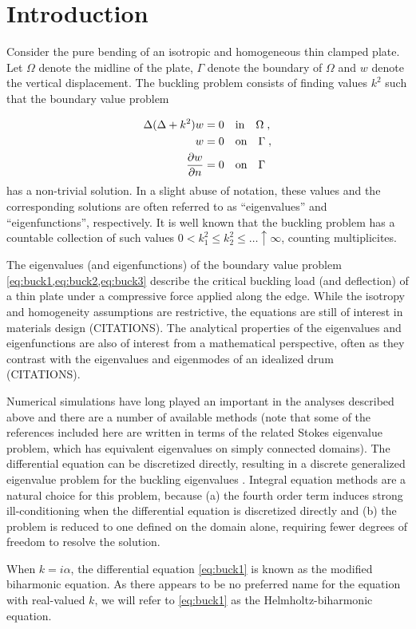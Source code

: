 \section{Introduction}


Consider the pure bending of an isotropic and homogeneous thin clamped
plate. 
Let $\Omega$ denote the midline of the plate, $\Gamma$ denote the 
boundary of $\Omega$ and $w$ denote the vertical displacement.
The buckling problem consists of finding 
values $k^{2}$ such that the boundary value problem

\begin{align}
\Delta (\Delta + k^2) w &= 0 \quad \text{in} \quad \Omega \label{eq:buck1} \; , \\
w &= 0 \quad \text{on} \quad \Gamma \label{eq:buck2} \; ,\\
\frac{\partial w}{\partial n} &=0 \quad \text{on} \quad \Gamma \label{eq:buck3} 
\end{align}
has a non-trivial solution. In a slight abuse of notation,
these values and the corresponding solutions are often
referred to as ``eigenvalues'' and ``eigenfunctions'',
respectively. 
It is well known that the buckling problem has a
countable collection of such values
$0 < k_{1}^{2} \leq k_{2}^2 \leq \ldots \uparrow \infty$,
counting multiplicites.

The eigenvalues (and eigenfunctions)
of the boundary value problem \cref{eq:buck1,eq:buck2,eq:buck3}
describe the critical buckling load (and deflection)
of a thin plate under
a compressive force applied along the edge. While the
isotropy and homogeneity assumptions are restrictive,
the equations are still of interest in materials design
(CITATIONS). The analytical properties of the eigenvalues and
eigenfunctions are also of interest from a mathematical
perspective, often as they contrast with the eigenvalues
and eigenmodes of an idealized drum (CITATIONS).

Numerical simulations have long played an important
in the analyses described above and there are a number
of available methods (note that some of the references
included here are written in terms of the related
Stokes eigenvalue problem, which has equivalent
eigenvalues on simply connected domains).
The differential equation can
be discretized directly, resulting in a discrete
generalized eigenvalue problem for the buckling
eigenvalues \cite{jia2009approximation}. Integral
equation methods \cite{kitahara2014boundary} are
a natural choice for this problem, because (a) the
fourth order term induces strong
ill-conditioning when the differential equation
is discretized directly and (b) the problem is reduced
to one defined on the domain alone, requiring fewer
degrees of freedom to resolve the solution.

\begin{remark}
  When $k = i\alpha$, the differential equation
  \cref{eq:buck1} is known as the modified biharmonic
  equation. As there appears to be no preferred
  name for the equation with real-valued $k$,
  we will refer to \cref{eq:buck1} as the
  Helmholtz-biharmonic equation.
\end{remark}

